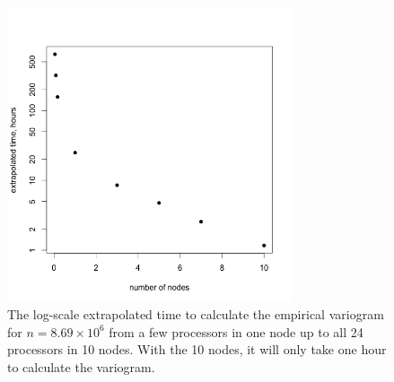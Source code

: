 \begin{figure}[!h]
   \centering
   \includegraphics[width=0.75\textwidth]{./fig/extrapolate.png} %
   \caption{The log-scale extrapolated time to calculate the empirical variogram for $n=8.69\times10^6$ from a few processors in one node up to all 24 processors in 10 nodes. With the 10 nodes, it will only take one hour to calculate the variogram.}
   \label{fig:extrapolate}
\end{figure}
